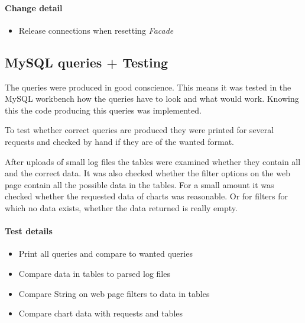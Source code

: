 \paragraph{Change detail} 
\begin{itemize}
  \item Release connections when resetting \textit{Facade}
\end{itemize}


\subsection{MySQL queries + Testing}
The queries were produced in good conscience. This means it was tested in the 
MySQL workbench how the queries have to look and what would work. Knowing this
the code producing this queries was implemented.

To test whether correct queries are produced they were printed for several requests
and checked by hand if they are of the wanted format.

After uploads of small log files the tables were examined whether they contain all
and the correct data. It was also checked whether the filter options on the web page
contain all the possible data in the tables. For a small amount it was checked
whether the requested data of charts was reasonable. Or for filters for which no 
data exists, whether the data returned is really empty.


\paragraph{Test details}
\begin{itemize}
  \item Print all queries and compare to wanted queries
  \item Compare data in tables to parsed log files
  \item Compare String on web page filters to data in tables 
  \item Compare chart data with requests and tables
\end{itemize}




